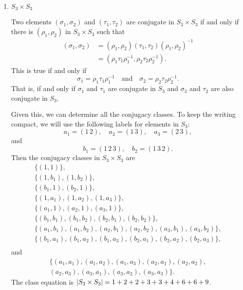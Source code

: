 \begin{enumerate}
\item $S_3\times S_3$
  \begin{solution}
    Two elements $(\sigma_1, \sigma_2)$ and $(\tau_1, \tau_2)$ are
    conjugate in $S_3\times S_3$ if and only if there is
    $(\rho_1, \rho_2)$ in $S_3\times S_3$ such that
    \begin{align*}
      (\sigma_1, \sigma_2)
      &= (\rho_1, \rho_2)(\tau_1, \tau_2)(\rho_1, \rho_2)^{-1} \\
      &= (\rho_1\tau_1\rho_1^{-1}, \rho_2\tau_2\rho_2^{-1}).
    \end{align*}
    This is true if and only if
    \begin{equation*}
      \sigma_1 = \rho_1\tau_1\rho_1^{-1} \quad\text{and}\quad
      \sigma_2 = \rho_2\tau_2\rho_2^{-1}.
    \end{equation*}
    That is, if and only if $\sigma_1$ and $\tau_1$ are conjugate in
    $S_3$ and $\sigma_2$ and $\tau_2$ are also conjugate in $S_3$.

    Given this, we can determine all the conjugacy classes. To keep
    the writing compact, we will use the following labels for elements in $S_3$:
    \begin{equation*}
      a_1 = (1\,2), \quad a_2 = (1\,3), \quad a_3 = (2\,3),
    \end{equation*}
    and
    \begin{equation*}
      b_1 = (1\,2\,3), \quad b_2 = (1\,3\,2).
    \end{equation*}
    Then the conjugacy classes in $S_3\times S_3$ are
    \begin{gather*}
      \{(1, 1)\}, \\
      \{(1, b_1), (1, b_2)\}, \\
      \{(b_1, 1), (b_2, 1)\}, \\
      \{(1, a_1), (1, a_2), (1, a_3)\}, \\
      \{(a_1, 1), (a_2, 1), (a_3, 1)\}, \\
      \{(b_1, b_1), (b_1, b_2),
      (b_2, b_1), (b_2, b_2)\}, \\
      \{(a_1, b_1), (a_1, b_2),
      (a_2, b_1), (a_2, b_2),
      (a_3, b_1), (a_3, b_2)\},\\
      \{(b_1, a_1), (b_1, a_2), (b_1, a_3),
      (b_2, a_1), (b_2, a_2), (b_2, a_3)\},\\
    \end{gather*}
    and
    \begin{multline*}
      \{(a_1,a_1), (a_1, a_2), (a_1, a_3),
      (a_2,a_1), (a_2, a_2), \\ (a_2, a_3),
      (a_3,a_1), (a_3, a_2), (a_3, a_3)\}.
    \end{multline*}
    The class equation is
    $\lvert{S_3\times S_3}\rvert = 1 + 2 + 2 + 3 + 3 + 4 + 6 + 6 + 9$.
  \end{solution}


\end{enumerate}
